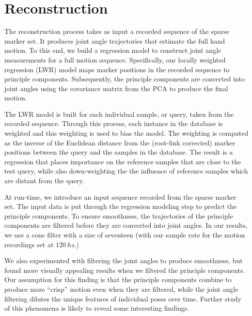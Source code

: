 
\section{Reconstruction}

The reconstruction process takes as input a recorded sequence of the sparse marker set.  It produces joint angle trajectories that estimate the full hand motion.  
To this end, we build a regression model to construct joint angle measurements for a full motion sequence. Specifically, our locally weighted regression (LWR) model maps marker positions in the recorded sequence to principle components. Subsequently, the principle components are converted into joint angles using the covariance matrix from the PCA to produce the final motion.

The LWR model is built for each individual sample, or query, taken from the
recorded sequence.  Through this process,
each instance in the database is weighted and this weighting is used
to bias the model.  The weighting is computed as the inverse
of the Euclidean distance from the (root-link corrected) marker positions 
between the query and the samples in the database.  The result
is a regression that places importance on the reference samples
that are close to the test query, while also down-weighting the
the influence of reference samples which are distant
from the query.  

At run-time, we introduce an input sequence
recorded from the sparse marker set. The input data is 
put through the regression modeling step to predict the principle components.
To ensure smoothness, the trajectories of the principle components
are filtered before they are converted into joint angles.  In our results, 
we use a cone filter with a size of seventeen (with our sample rate for
the motion recordings set at $120~hz$.)

We also experimented with
filtering the joint angles to produce smoothness, but found more visually 
appealing results when we filtered the principle components.  Our 
assumption for this finding is that the principle components combine
to produce more ``crisp'' motion even when they are filtered, while
the joint angle filtering dilutes the unique features of individual
poses over time.  Further study of this phenomena is likely to 
reveal some interesting findings.







